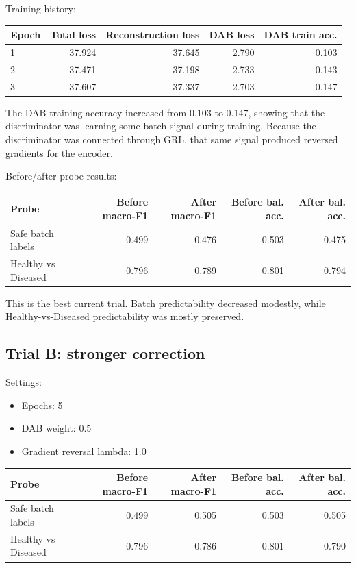 \documentclass[11pt]{article}
\begin{document}
Training history:

\begin{center}
\begin{tabular}{lrrrr}
\toprule
Epoch & Total loss & Reconstruction loss & DAB loss & DAB train acc. \\
\midrule
1 & 37.924 & 37.645 & 2.790 & 0.103 \\
2 & 37.471 & 37.198 & 2.733 & 0.143 \\
3 & 37.607 & 37.337 & 2.703 & 0.147 \\
\bottomrule
\end{tabular}
\end{center}

The DAB training accuracy increased from 0.103 to 0.147, showing that the discriminator
was learning some batch signal during training. Because the discriminator was connected
through GRL, that same signal produced reversed gradients for the encoder.

Before/after probe results:

\begin{center}
\begin{tabular}{lrrrr}
\toprule
Probe & Before macro-F1 & After macro-F1 & Before bal. acc. & After bal. acc. \\
\midrule
Safe batch labels & 0.499 & 0.476 & 0.503 & 0.475 \\
Healthy vs Diseased & 0.796 & 0.789 & 0.801 & 0.794 \\
\bottomrule
\end{tabular}
\end{center}

This is the best current trial. Batch predictability decreased modestly, while
Healthy-vs-Diseased predictability was mostly preserved.

\subsection{Trial B: stronger correction}

Settings:

\begin{itemize}
  \item Epochs: 5
  \item DAB weight: 0.5
  \item Gradient reversal lambda: 1.0
\end{itemize}

\begin{center}
\begin{tabular}{lrrrr}
\toprule
Probe & Before macro-F1 & After macro-F1 & Before bal. acc. & After bal. acc. \\
\midrule
Safe batch labels & 0.499 & 0.505 & 0.503 & 0.505 \\
Healthy vs Diseased & 0.796 & 0.786 & 0.801 & 0.790 \\
\bottomrule
\end{tabular}
\end{center}
\end{document}
